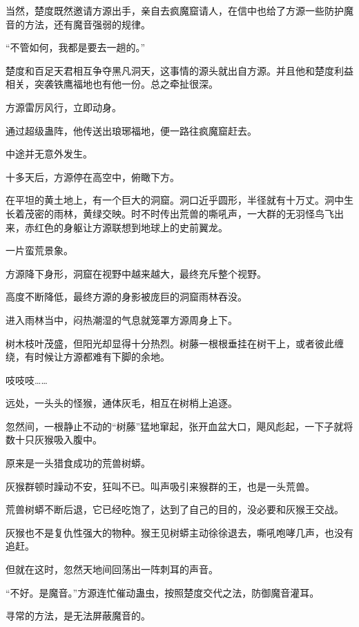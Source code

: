 
\begin{this_body}

当然，楚度既然邀请方源出手，亲自去疯魔窟请人，在信中也给了方源一些防护魔音的方法，还有魔音强弱的规律。

“不管如何，我都是要去一趟的。”

楚度和百足天君相互争夺黑凡洞天，这事情的源头就出自方源。并且他和楚度利益相关，突袭铁鹰福地也有他一份。总之牵扯很深。

方源雷厉风行，立即动身。

通过超级蛊阵，他传送出琅琊福地，便一路往疯魔窟赶去。

中途并无意外发生。

十多天后，方源停在高空中，俯瞰下方。

在平坦的黄土地上，有一个巨大的洞窟。洞口近乎圆形，半径就有十万丈。洞中生长着茂密的雨林，黄绿交映。时不时传出荒兽的嘶吼声，一大群的无羽怪鸟飞出来，赤红色的身躯让方源联想到地球上的史前翼龙。

一片蛮荒景象。

方源降下身形，洞窟在视野中越来越大，最终充斥整个视野。

高度不断降低，最终方源的身影被庞巨的洞窟雨林吞没。

进入雨林当中，闷热潮湿的气息就笼罩方源周身上下。

树木枝叶茂盛，但阳光却显得十分热烈。树藤一根根垂挂在树干上，或者彼此缠绕，有时候让方源都难有下脚的余地。

吱吱吱……

远处，一头头的怪猴，通体灰毛，相互在树梢上追逐。

忽然间，一根静止不动的“树藤”猛地窜起，张开血盆大口，飓风彪起，一下子就将数十只灰猴吸入腹中。

原来是一头猎食成功的荒兽树蟒。

灰猴群顿时躁动不安，狂叫不已。叫声吸引来猴群的王，也是一头荒兽。

荒兽树蟒不断后退，它已经吃饱了，达到了自己的目的，没必要和灰猴王交战。

灰猴也不是复仇性强大的物种。猴王见树蟒主动徐徐退去，嘶吼咆哮几声，也没有追赶。

但就在这时，忽然天地间回荡出一阵刺耳的声音。

“不好。是魔音。”方源连忙催动蛊虫，按照楚度交代之法，防御魔音灌耳。

寻常的方法，是无法屏蔽魔音的。


\end{this_body}
